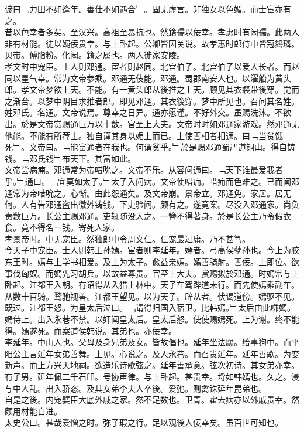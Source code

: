 \documentclass{zhvt-classic}
\begin{document}

\hspace*{2em}谚曰﹁力田不如逢年。善仕不如遇合﹂。固无虚言。非独女以色媚。而士宦亦有之。\\
\hspace*{2em}昔以色幸者多矣。至汉兴。高祖至暴抗也。然籍孺以佞幸。孝惠时有闳孺。此两人非有材能。徒以婉佞贵幸。与上卧起。公卿皆因关说。故孝惠时郎侍中皆冠鵕璘。贝带。傅脂粉。化闳。籍之属也。两人徙家安陵。\\
\hspace*{2em}孝文时中宠臣。士人则邓通。宦者则赵同。北宫伯子。北宫伯子以爱人长者。而赵同以星气幸。常为文帝参乘。邓通无伎能。邓通。蜀郡南安人也。以濯船为黄头郎。孝文帝梦欲上天。不能。有一黄头郎从後推之上天。顾见其衣裻带後穿。觉而之渐台。以梦中阴目求推者郎。即见邓通。其衣後穿。梦中所见也。召问其名姓。姓邓氏。名通。文帝说焉。尊幸之日异。通亦愿谨。不好外交。虽赐洗沐。不欲出。於是文帝赏赐通巨万以十数。官至上大夫。文帝时时如邓通家游戏。然邓通无他能。不能有所荐士。独自谨其身以媚上而已。上使善相者相通。曰﹁当贫饿死﹂。文帝曰。﹁能富通者在我也。何谓贫乎。﹂於是赐邓通蜀严道铜山。得自铸钱。﹁邓氏钱﹂布天下。其富如此。\\
\hspace*{2em}文帝尝病痈。邓通常为帝唶吮之。文帝不乐。从容问通曰。﹁天下谁最爱我者乎。﹂通曰。﹁宜莫如太子。﹂太子入问病。文帝使唶痈。唶痈而色难之。已而闻邓通常为帝唶吮之。心惭。由此怨通矣。及文帝崩。景帝立。邓通免。家居。居无何。人有告邓通盗出徼外铸钱。下吏验问。颇有之。遂竟案。尽没入邓通家。尚负责数巨万。长公主赐邓通。吏辄随没入之。一簪不得著身。於是长公主乃令假衣食。竟不得名一钱。寄死人家。\\
\hspace*{2em}孝景帝时。中无宠臣。然独郎中令周文仁。仁宠最过庸。乃不甚笃。\\
\hspace*{2em}今天子中宠臣。士人则韩王孙嫣。宦者则李延年。嫣者。弓高侯孽孙也。今上为胶东王时。嫣与上学书相爱。及上为太子。愈益亲嫣。嫣善骑射。善佞。上即位。欲事伐匈奴。而嫣先习胡兵。以故益尊贵。官至上大夫。赏赐拟於邓通。时嫣常与上卧起。江都王入朝。有诏得从入猎上林中。天子车驾跸道未行。而先使嫣乘副车。从数十百骑。骛驰视兽。江都王望见。以为天子。辟从者。伏谒道傍。嫣驱不见。既过。江都王怒。为皇太后泣曰。﹁请得归国入宿卫。比韩嫣。﹂太后由此嗛嫣。嫣侍上。出入永巷不禁。以奸闻皇太后。皇太后怒。使使赐嫣死。上为谢。终不能得。嫣遂死。而案道侯韩说。其弟也。亦佞幸。\\
\hspace*{2em}李延年。中山人也。父母及身兄弟及女。皆故倡也。延年坐法腐。给事狗中。而平阳公主言延年女弟善舞。上见。心说之。及入永巷。而召贵延年。延年善歌。为变新声。而上方兴天地祠。欲造乐诗歌弦之。延年善承意。弦次初诗。其女弟亦幸。有子男。延年佩二千石印。号协声律。与上卧起。甚贵幸。埒如韩嫣也。久之。浸与中人乱。出入骄恣。及其女弟李夫人卒後。爱弛。则禽诛延年昆弟也。\\
\hspace*{2em}自是之後。内宠嬖臣大底外戚之家。然不足数也。卫青。霍去病亦以外戚贵幸。然颇用材能自进。\\
\hspace*{2em}太史公曰。甚哉爱憎之时。弥子瑕之行。足以观後人佞幸矣。虽百世可知也。\\
\end{document}
